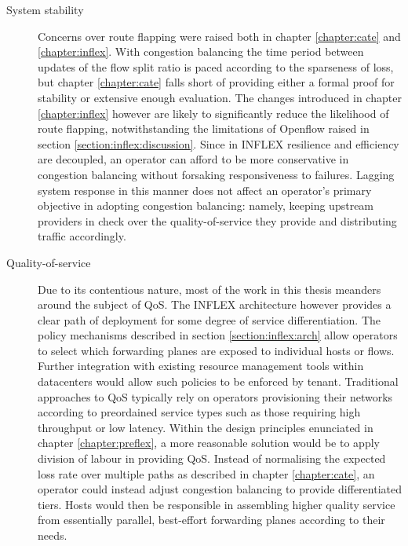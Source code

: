 \renewcommand{\descriptionlabel}[1]{\hspace{\labelsep}\textbf{#1.}}
\begin{description}
\item[System stability]{
Concerns over route flapping were raised both in chapter \ref{chapter:cate} and \ref{chapter:inflex}.
With congestion balancing the time period between updates of the flow split ratio is paced according to the sparseness of loss, but chapter \ref{chapter:cate} falls short of providing either a formal proof for stability or extensive enough evaluation.
The changes introduced in chapter \ref{chapter:inflex} however are likely to significantly reduce the likelihood of route flapping, notwithstanding the limitations of Openflow raised in section \ref{section:inflex:discussion}.
Since in INFLEX resilience and efficiency are decoupled, an operator can afford to be more conservative in congestion balancing without forsaking responsiveness to failures.
Lagging system response in this manner does not affect an operator's primary objective in adopting congestion balancing: namely, keeping upstream providers in check over the quality-of-service they provide and distributing traffic accordingly.
}
\item[Quality-of-service]{
Due to its contentious nature, most of the work in this thesis meanders around the subject of \ac{QoS}.
The INFLEX architecture however provides a clear path of deployment for some degree of service differentiation.
The policy mechanisms described in section \ref{section:inflex:arch} allow operators to select which forwarding planes are exposed to individual hosts or flows.
Further integration with existing resource management tools within datacenters would allow such policies to be enforced by tenant.
Traditional approaches to \ac{QoS} typically rely on operators provisioning their networks according to preordained service types such as those requiring high throughput or low latency.
Within the design principles enunciated in chapter \ref{chapter:preflex}, a more reasonable solution would be to apply division of labour in providing \ac{QoS}.
Instead of normalising the expected loss rate over multiple paths as described in chapter \ref{chapter:cate}, an operator could instead adjust congestion balancing to provide differentiated tiers.
Hosts would then be responsible in assembling higher quality service from essentially parallel, best-effort forwarding planes according to their needs.
}



\end{description}
